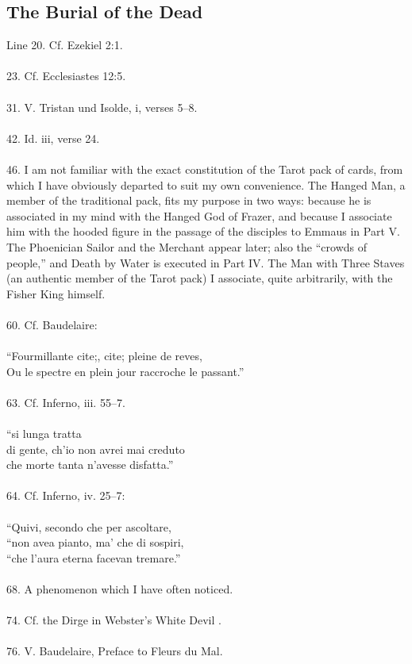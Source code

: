 \documentclass{article}
\begin{document}
\subsection{The Burial of the Dead}
Line 20.  Cf.  Ezekiel 2:1. \\
 \\
23.  Cf.  Ecclesiastes 12:5. \\
 \\
31.  V.  Tristan und Isolde, i, verses 5--8. \\
 \\
42.  Id.  iii, verse 24. \\
 \\
46.  I am not familiar with the exact constitution of the Tarot pack
of cards, from which I have obviously departed to suit my own convenience.
The Hanged Man, a member of the traditional pack, fits my purpose
in two ways:  because he is associated in my mind with the Hanged God
of Frazer, and because I associate him with the hooded figure in
the passage of the disciples to Emmaus in Part V. The Phoenician Sailor
and the Merchant appear later; also the ``crowds of people,'' and
Death by Water is executed in Part IV.  The Man with Three Staves
(an authentic member of the Tarot pack) I associate, quite arbitrarily,
with the Fisher King himself. \\
 \\
60.  Cf.  Baudelaire: \\
 \\
\indent     ``Fourmillante cite;, cite; pleine de reves, \\
\indent     Ou le spectre en plein jour raccroche le passant.'' \\
 \\
63.  Cf.  Inferno, iii.  55--7. \\
 \\
\hspace*{2in} ``si lunga tratta \\
\indent     di gente, ch'io non avrei mai creduto \\
\indent     che morte tanta n'avesse disfatta.'' \\
 \\
64.  Cf.  Inferno, iv.  25--7: \\
 \\
\indent     ``Quivi, secondo che per ascoltare, \\
\indent     ``non avea pianto, ma' che di sospiri, \\
\indent     ``che l'aura eterna facevan tremare.'' \\
 \\
68.  A phenomenon which I have often noticed. \\
 \\
74.  Cf.  the Dirge in Webster's White Devil . \\
 \\
76.  V. Baudelaire, Preface to Fleurs du Mal. \\
\end{document}
